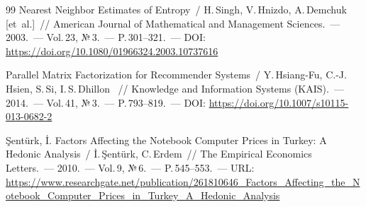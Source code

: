 \documentclass{stud-conf-pmk}
\begin{document}
\begin{paper}
\begin{thebibliography}{99}
Nearest Neighbor Estimates of Entropy~/ H.\,Singh, V.\,Hnizdo, A.\,Demchuk
[et~al.]~// American Journal of Mathematical and Management Sciences.~---
2003.~--- Vol.\,23, №\,3.~--- P.\,301--321.~--- DOI: \url{https://doi.org/10.1080/01966324.2003.10737616}

 Parallel Matrix Factorization for Recommender Systems~/
Y.\,Hsiang-Fu, C.-J.\,Hsien, S.\,Si, I.\,S.\,Dhillon~ // Knowledge and
Information Systems (KAIS).~--- 2014.~--- Vol.\,41, №\,3.~--- P.\,793--819.~--- DOI: \url{https://doi.org/10.1007/s10115-013-0682-2}

\c{S}ent\"{u}rk, \.{I}. Factors Affecting the Notebook Computer Prices in
Turkey: A Hedonic Analysis~/ \.{I}.\,\c{S}ent\"{u}rk, C.\,Erdem~//
The Empirical Economics Letters.~--- 2010.~--- Vol.\,9, №\,6.~---
P.\,545--553.~--- URL: \url{https://www.researchgate.net/publication/261810646_Factors_Affecting_the_Notebook_Computer_Prices_in_Turkey_A_Hedonic_Analysis}
\end{thebibliography}

\end{paper}
\end{document}
